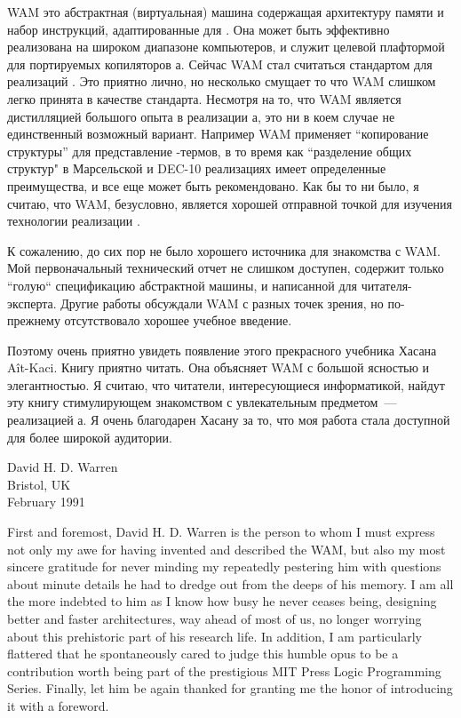 WAM это абстрактная (виртуальная) машина содержащая архитектуру памяти и набор
инструкций, адаптированные для . Она может быть эффективно реализована
на широком диапазоне компьютеров, и служит целевой плафтормой для портируемых
копиляторов \prolog а. Сейчас WAM стал считаться стандартом для реализаций
\prolog. Это приятно лично, но несколько смущает то что WAM слишком легко
принята в качестве стандарта. Несмотря на то, что WAM является дистилляцией
большого опыта в реализации \prolog а, это ни в коем случае не единственный
возможный вариант. Например WAM применяет ``копирование структуры'' для
представление \prolog-термов, в то время как ``разделение общих
структур" в Марсельской и DEC-10 реализациях имеет определенные преимущества,
и все еще может быть рекомендовано. Как бы то ни было, я считаю, что WAM,
безусловно, является хорошей отправной точкой для изучения технологии
реализации \prolog.

К сожалению, до сих пор не было хорошего источника для знакомства с WAM. Мой
первоначальный технический отчет не слишком доступен, содержит только ``голую``
спецификацию абстрактной машины, и написанной для читателя-эксперта. Другие
работы обсуждали WAM с разных точек зрения, но по-прежнему отсутствовало хорошее
учебное введение.

Поэтому очень приятно увидеть появление этого прекрасного учебника Хасана
A\^it-Kaci. Книгу приятно читать. Она объясняет WAM с большой ясностью и
элегантностью. Я считаю, что читатели, интересующиеся информатикой, найдут эту
книгу стимулирующем знакомством с увлекательным предметом\ --- реализацией
\prolog а. Я очень благодарен Хасану за то, что моя работа стала доступной для
более широкой аудитории.

\bigskip
\begin{flushright}
David H. D. Warren\\
Bristol, UK\\
February 1991
\end{flushright}
\clearpage


First and foremost, David H. D. Warren is the person to whom I must express
not only my awe for having invented and described the WAM, but also my most
sincere gratitude for never minding my repeatedly pestering him with questions
about minute details he had to dredge out from the deeps of his memory. I am all
the more indebted to him as I know how busy he never ceases being, designing
better and faster architectures, way ahead of most of us, no longer worrying about
this prehistoric part of his research life. In addition, I am particularly flattered that
he spontaneously cared to judge this humble opus to be a contribution worth being
part of the prestigious MIT Press Logic Programming Series. Finally, let him be
again thanked for granting me the honor of introducing it with a foreword.

